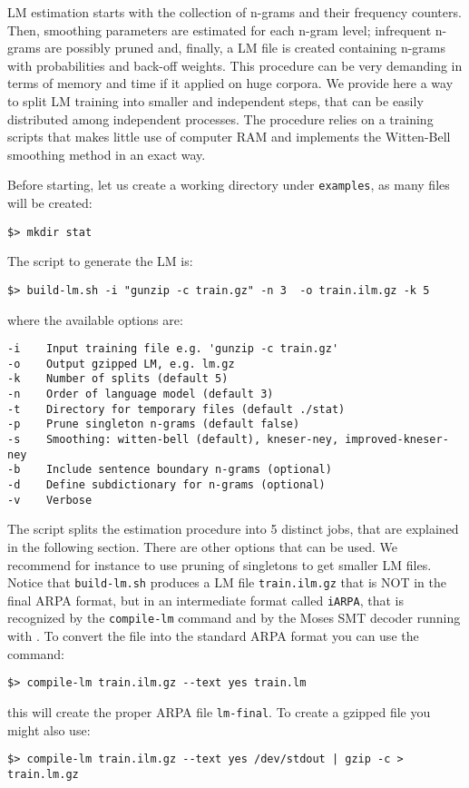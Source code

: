 LM estimation starts with the collection of n-grams and their frequency counters. Then, 
smoothing parameters are estimated for each n-gram level; infrequent n-grams are
possibly pruned and, finally, a LM file is created containing n-grams with probabilities and 
back-off weights.  This procedure can be very demanding in terms of memory and
time if it applied on huge corpora.   We provide here a way to split LM training  into smaller and independent steps, that can be easily distributed among independent processes. The  
procedure relies on a training scripts that makes little use of computer RAM and implements 
the  Witten-Bell smoothing method in an exact way.  

\noindent
Before starting, let us create a working directory under {\tt examples}, as many files will be created:

\begin{verbatim}
$> mkdir stat
\end{verbatim}

The script to generate the LM is:

\begin{verbatim}
$> build-lm.sh -i "gunzip -c train.gz" -n 3  -o train.ilm.gz -k 5
\end{verbatim}
where the available options are:

\begin{verbatim}
-i    Input training file e.g. 'gunzip -c train.gz'
-o    Output gzipped LM, e.g. lm.gz
-k    Number of splits (default 5)
-n    Order of language model (default 3)
-t    Directory for temporary files (default ./stat)
-p    Prune singleton n-grams (default false)
-s    Smoothing: witten-bell (default), kneser-ney, improved-kneser-ney 
-b    Include sentence boundary n-grams (optional)
-d    Define subdictionary for n-grams (optional)
-v    Verbose
\end{verbatim}

\noindent
The script splits the estimation procedure into 5 distinct jobs, that are explained in
the following section. There are other options that can be used. We recommend for instance to use pruning of singletons to get smaller LM files. 
Notice that {\tt build-lm.sh} produces a LM file {\tt train.ilm.gz} that is NOT in the final ARPA format, but in
an intermediate format called {\tt iARPA}, that is recognized by the {\tt compile-lm} 
command and by the Moses SMT decoder running with {\IRSTLM}. 
To convert the file into the standard ARPA format you can use the command:

\begin{verbatim}
$> compile-lm train.ilm.gz --text yes train.lm 
\end{verbatim}
this will create the proper ARPA file {\tt lm-final}.
To create a gzipped file you might also use:
\begin{verbatim}
$> compile-lm train.ilm.gz --text yes /dev/stdout | gzip -c > train.lm.gz
\end{verbatim}


